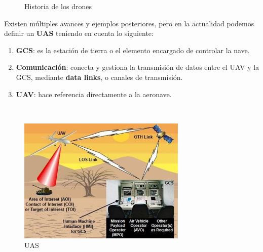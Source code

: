 \begin{figure} [h]
	\centering
	\quad
	\quad
	\caption{Historia de los drones}
	\label{fig:drone_history}
\end{figure}

\newpage
Existen múltiples avances y ejemplos posteriores, pero en la actualidad podemos definir un \textbf{\ac{UAS}} teniendo en cuenta lo siguiente:

\begin{enumerate}
	\item \textbf{\ac{GCS}}: es la estación de tierra o el elemento encargado de controlar la nave.

	\item \textbf{Comunicación}: conecta y gestiona la transmisión de datos entre el \ac{UAV} y la \ac{GCS}, mediante \textbf{data links}, o canales de transmisión.
	
    \item \textbf{\ac{UAV}}: hace referencia directamente a la aeronave.
\end{enumerate} \cite{uas-definicion} \cite{gcs-definicion} \cite{data-link-definicion} \\

\begin{figure} [H]
	\begin{center}
	\includegraphics[height=6cm]{imagenes/cap1/7_drone_components.jpeg}
	\end{center}
	\caption[UAS]{UAS}
	\label{fig:drone_components}
\end{figure}

